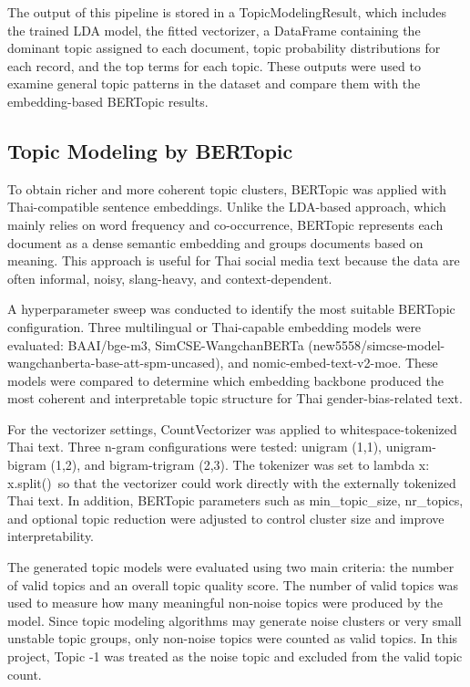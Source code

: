 \documentclass[12pt,oneside,openright,a4paper]{cpe-english-project}
\begin{document}
The output of this pipeline is stored in a TopicModelingResult, which includes the trained LDA model, the fitted vectorizer, a DataFrame containing the dominant topic assigned to each document, topic probability distributions for each record, and the top terms for each topic. These outputs were used to examine general topic patterns in the dataset and compare them with the embedding-based BERTopic results.

\subsection{Topic Modeling by BERTopic}

To obtain richer and more coherent topic clusters, BERTopic was applied with Thai-compatible sentence embeddings. Unlike the LDA-based approach, which mainly relies on word frequency and co-occurrence, BERTopic represents each document as a dense semantic embedding and groups documents based on meaning. This approach is useful for Thai social media text because the data are often informal, noisy, slang-heavy, and context-dependent.

A hyperparameter sweep was conducted to identify the most suitable BERTopic configuration. Three multilingual or Thai-capable embedding models were evaluated: BAAI/bge-m3, SimCSE-WangchanBERTa (new5558/simcse-model-wangchanberta-base-att-spm-uncased), and nomic-embed-text-v2-moe. These models were compared to determine which embedding backbone produced the most coherent and interpretable topic structure for Thai gender-bias-related text.

For the vectorizer settings, CountVectorizer was applied to whitespace-tokenized Thai text. Three n-gram configurations were tested: unigram (1,1), unigram-bigram (1,2), and bigram-trigram (2,3). The tokenizer was set to lambda x: x.split()~so that the vectorizer could work directly with the externally tokenized Thai text. In addition, BERTopic parameters such as min\_topic\_size, nr\_topics, and optional topic reduction were adjusted to control cluster size and improve interpretability.

The generated topic models were evaluated using two main criteria: the number of valid topics and an overall topic quality score. The number of valid topics was used to measure how many meaningful non-noise topics were produced by the model. Since topic modeling algorithms may generate noise clusters or very small unstable topic groups, only non-noise topics were counted as valid topics. In this project, Topic -1 was treated as the noise topic and excluded from the valid topic count.
\end{document}
